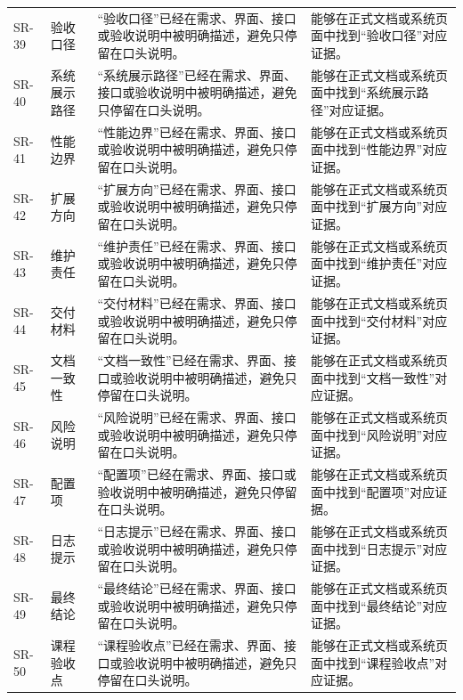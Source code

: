 \documentclass[12pt,a4paper]{ctexart}
\begin{document}
\begin{longtable}{L{1.7cm}L{3.0cm}L{6.2cm}L{4.4cm}}
SR-39 & 验收口径 & “验收口径”已经在需求、界面、接口或验收说明中被明确描述，避免只停留在口头说明。 & 能够在正式文档或系统页面中找到“验收口径”对应证据。 \\
SR-40 & 系统展示路径 & “系统展示路径”已经在需求、界面、接口或验收说明中被明确描述，避免只停留在口头说明。 & 能够在正式文档或系统页面中找到“系统展示路径”对应证据。 \\
SR-41 & 性能边界 & “性能边界”已经在需求、界面、接口或验收说明中被明确描述，避免只停留在口头说明。 & 能够在正式文档或系统页面中找到“性能边界”对应证据。 \\
SR-42 & 扩展方向 & “扩展方向”已经在需求、界面、接口或验收说明中被明确描述，避免只停留在口头说明。 & 能够在正式文档或系统页面中找到“扩展方向”对应证据。 \\
SR-43 & 维护责任 & “维护责任”已经在需求、界面、接口或验收说明中被明确描述，避免只停留在口头说明。 & 能够在正式文档或系统页面中找到“维护责任”对应证据。 \\
SR-44 & 交付材料 & “交付材料”已经在需求、界面、接口或验收说明中被明确描述，避免只停留在口头说明。 & 能够在正式文档或系统页面中找到“交付材料”对应证据。 \\
SR-45 & 文档一致性 & “文档一致性”已经在需求、界面、接口或验收说明中被明确描述，避免只停留在口头说明。 & 能够在正式文档或系统页面中找到“文档一致性”对应证据。 \\
SR-46 & 风险说明 & “风险说明”已经在需求、界面、接口或验收说明中被明确描述，避免只停留在口头说明。 & 能够在正式文档或系统页面中找到“风险说明”对应证据。 \\
SR-47 & 配置项 & “配置项”已经在需求、界面、接口或验收说明中被明确描述，避免只停留在口头说明。 & 能够在正式文档或系统页面中找到“配置项”对应证据。 \\
SR-48 & 日志提示 & “日志提示”已经在需求、界面、接口或验收说明中被明确描述，避免只停留在口头说明。 & 能够在正式文档或系统页面中找到“日志提示”对应证据。 \\
SR-49 & 最终结论 & “最终结论”已经在需求、界面、接口或验收说明中被明确描述，避免只停留在口头说明。 & 能够在正式文档或系统页面中找到“最终结论”对应证据。 \\
SR-50 & 课程验收点 & “课程验收点”已经在需求、界面、接口或验收说明中被明确描述，避免只停留在口头说明。 & 能够在正式文档或系统页面中找到“课程验收点”对应证据。 \\
\bottomrule
\end{longtable}
\end{document}
